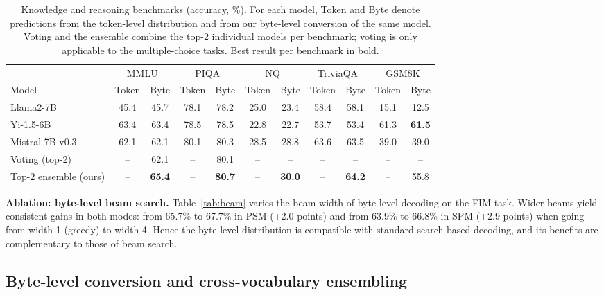 \documentclass{article} %
\begin{document}
\begin{table}[t]
\caption{Knowledge and reasoning benchmarks (accuracy, \%). For each model, Token and Byte denote predictions from the token-level distribution and from our byte-level conversion of the same model. Voting and the ensemble combine the top-2 individual models per benchmark; voting is only applicable to the multiple-choice tasks. Best result per benchmark in bold.}
\label{tab:general}
\begin{center}
\small
\setlength{\tabcolsep}{4.2pt}
\begin{tabular}{lcccccccccc}
\toprule
 & \multicolumn{2}{c}{MMLU} & \multicolumn{2}{c}{PIQA} & \multicolumn{2}{c}{NQ} & \multicolumn{2}{c}{TriviaQA} & \multicolumn{2}{c}{GSM8K} \\
\cmidrule(lr){2-3}\cmidrule(lr){4-5}\cmidrule(lr){6-7}\cmidrule(lr){8-9}\cmidrule(lr){10-11}
Model & Token & Byte & Token & Byte & Token & Byte & Token & Byte & Token & Byte \\
\midrule
Llama2-7B & 45.4 & 45.7 & 78.1 & 78.2 & 25.0 & 23.4 & 58.4 & 58.1 & 15.1 & 12.5 \\
Yi-1.5-6B & 63.4 & 63.4 & 78.5 & 78.5 & 22.8 & 22.7 & 53.7 & 53.4 & 61.3 & \textbf{61.5} \\
Mistral-7B-v0.3 & 62.1 & 62.1 & 80.1 & 80.3 & 28.5 & 28.8 & 63.6 & 63.5 & 39.0 & 39.0 \\
\midrule
Voting (top-2) & -- & 62.1 & -- & 80.1 & -- & -- & -- & -- & -- & -- \\
Top-2 ensemble (ours) & -- & \textbf{65.4} & -- & \textbf{80.7} & -- & \textbf{30.0} & -- & \textbf{64.2} & -- & 55.8 \\
\bottomrule
\end{tabular}
\end{center}
\end{table}

\textbf{Ablation: byte-level beam search.} Table~\ref{tab:beam} varies the beam width of byte-level decoding on the FIM task. Wider beams yield consistent gains in both modes: from 65.7\% to 67.7\% in PSM (+2.0 points) and from 63.9\% to 66.8\% in SPM (+2.9 points) when going from width 1 (greedy) to width 4. Hence the byte-level distribution is compatible with standard search-based decoding, and its benefits are complementary to those of beam search.

\subsection{Byte-level conversion and cross-vocabulary ensembling}
\label{sec:exp_ensemble}
\end{document}
